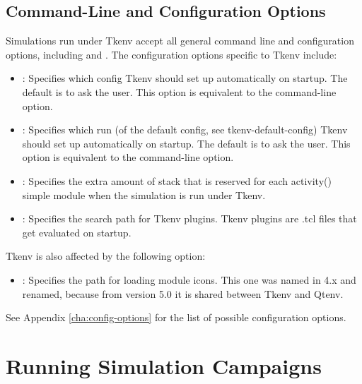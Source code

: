 \subsection{Command-Line and Configuration Options}
\label{sec:run-sim:tkenv-options}

Simulations run under Tkenv accept all general command line
and configuration options, including  and . 
The configuration options specific to Tkenv include:

\begin{itemize}
  \item {}:
    Specifies which config Tkenv should set up automatically on startup. The
    default is to ask the user. This option is equivalent to the 
    command-line option.

  \item {}: Specifies which run (of the default
    config, see tkenv-default-config) Tkenv should set up automatically on startup.
    The default is to ask the user. This option is equivalent to the 
    command-line option.

  \item {}:
    Specifies the extra amount of stack that is reserved for each activity()
    simple module when the simulation is run under Tkenv.

  \item {}:
    Specifies the search path for Tkenv plugins. Tkenv plugins are .tcl files
    that get evaluated on startup.
\end{itemize}

Tkenv is also affected by the following option:

\begin{itemize}
  \item {}: Specifies the path for loading module icons.
    This one was named  in {\opp} 4.x and renamed,
    because from version 5.0 it is shared between Tkenv and Qtenv.
\end{itemize}

See Appendix \ref{cha:config-options} for the list of possible configuration
options.


\section{Running Simulation Campaigns}
\label{sec:run-sim:simulation-campaigns}

